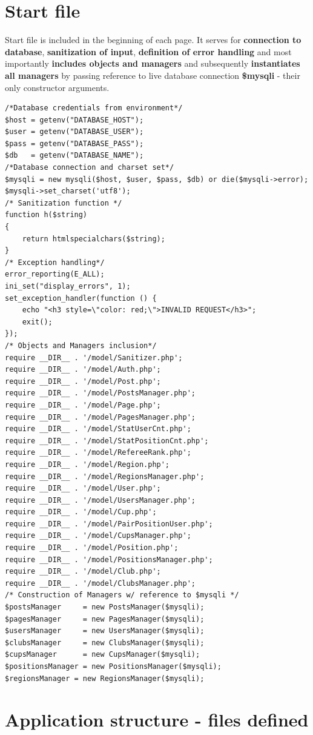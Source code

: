 \section{Start file}
Start file is included in the beginning of each page. It serves for \textbf{connection to database},  \textbf{sanitization of input}, \textbf{definition of error handling} and most importantly \textbf{includes objects and managers} and subsequently \textbf{instantiates all managers} by passing reference to live database connection \textbf{\$mysqli} - their only constructor arguments.
\begin{lstlisting}
/*Database credentials from environment*/
$host = getenv("DATABASE_HOST");
$user = getenv("DATABASE_USER");
$pass = getenv("DATABASE_PASS");
$db   = getenv("DATABASE_NAME");
/*Database connection and charset set*/
$mysqli = new mysqli($host, $user, $pass, $db) or die($mysqli->error);
$mysqli->set_charset('utf8');
/* Sanitization function */
function h($string)
{
    return htmlspecialchars($string);
}
/* Exception handling*/
error_reporting(E_ALL);
ini_set("display_errors", 1);
set_exception_handler(function () {
    echo "<h3 style=\"color: red;\">INVALID REQUEST</h3>";
    exit();
});
/* Objects and Managers inclusion*/
require __DIR__ . '/model/Sanitizer.php';
require __DIR__ . '/model/Auth.php';
require __DIR__ . '/model/Post.php';
require __DIR__ . '/model/PostsManager.php';
require __DIR__ . '/model/Page.php';
require __DIR__ . '/model/PagesManager.php';
require __DIR__ . '/model/StatUserCnt.php';
require __DIR__ . '/model/StatPositionCnt.php';
require __DIR__ . '/model/RefereeRank.php';
require __DIR__ . '/model/Region.php';
require __DIR__ . '/model/RegionsManager.php';
require __DIR__ . '/model/User.php';
require __DIR__ . '/model/UsersManager.php';
require __DIR__ . '/model/Cup.php';
require __DIR__ . '/model/PairPositionUser.php';
require __DIR__ . '/model/CupsManager.php';
require __DIR__ . '/model/Position.php';
require __DIR__ . '/model/PositionsManager.php';
require __DIR__ . '/model/Club.php';
require __DIR__ . '/model/ClubsManager.php';
/* Construction of Managers w/ reference to $mysqli */
$postsManager     = new PostsManager($mysqli);
$pagesManager     = new PagesManager($mysqli);
$usersManager     = new UsersManager($mysqli);
$clubsManager     = new ClubsManager($mysqli);
$cupsManager      = new CupsManager($mysqli);
$positionsManager = new PositionsManager($mysqli);
$regionsManager = new RegionsManager($mysqli);
\end{lstlisting}
\newpage
\section{Application structure - files defined}
